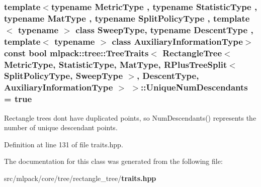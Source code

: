 \subsubsection[{Unique\+Num\+Descendants}]{\setlength{\rightskip}{0pt plus 5cm}template$<$typename Metric\+Type , typename Statistic\+Type , typename Mat\+Type , typename Split\+Policy\+Type , template$<$ typename $>$ class Sweep\+Type, typename Descent\+Type , template$<$ typename $>$ class Auxiliary\+Information\+Type$>$ const bool {\bf mlpack\+::tree\+::\+Tree\+Traits}$<$ {\bf Rectangle\+Tree}$<$ Metric\+Type, Statistic\+Type, Mat\+Type, {\bf R\+Plus\+Tree\+Split}$<$ Split\+Policy\+Type, Sweep\+Type $>$, Descent\+Type, Auxiliary\+Information\+Type $>$ $>$\+::Unique\+Num\+Descendants = true\hspace{0.3cm}{\ttfamily [static]}}\label{classmlpack_1_1tree_1_1TreeTraits_3_01RectangleTree_3_01MetricType_00_01StatisticType_00_01MatTyd3300c6b7e2f56d4c1027298545eb7bf_a5a4ee25f6db4ce862f262d678cbf1b42}


Rectangle trees don\textquotesingle{}t have duplicated points, so Num\+Descendants() represents the number of unique descendant points. 



Definition at line 131 of file traits.\+hpp.



The documentation for this class was generated from the following file\+:\begin{DoxyCompactItemize}
\item 
src/mlpack/core/tree/rectangle\+\_\+tree/{\bf traits.\+hpp}\end{DoxyCompactItemize}
